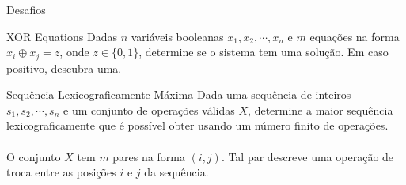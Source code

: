 \begin{frame}{Desafios}

\begin{block}{XOR Equations}
    Dadas $n$ variáveis booleanas $x_1, x_2, \cdots, x_n$ e $m$ equações na forma $x_i \oplus x_j = z$, onde $z \in \{0, 1\}$, determine se o sistema tem uma solução. Em caso positivo, descubra uma.
\end{block}

\begin{block}{Sequência Lexicograficamente Máxima}
    Dada uma sequência de inteiros $s_1, s_2, \cdots, s_n$ e um conjunto de operações válidas $X$, determine a maior sequência lexicograficamente que é possível obter usando um número finito de operações. \\~\\
    
    O conjunto $X$ tem $m$ pares na forma $(i, j)$. Tal par descreve uma operação de troca entre as posições $i$ e $j$ da sequência.
\end{block}
\end{frame}
